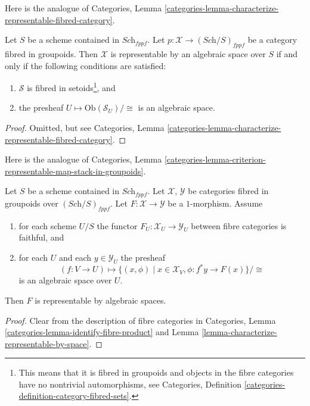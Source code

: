\noindent
Here is the analogue of Categories,
Lemma \ref{categories-lemma-characterize-representable-fibred-category}.

\begin{lemma}
\label{lemma-characterize-representable-by-space}
Let $S$ be a scheme contained in $\textit{Sch}_{fppf}$.
Let $p : \mathcal{X} \to (\textit{Sch}/S)_{fppf}$
be a category fibred in groupoids.
Then $\mathcal{X}$ is representable by an algebraic space over $S$
if and only if the following conditions are satisfied:
\begin{enumerate}
\item $\mathcal{S}$ is fibred in setoids\footnote{This means that
it is fibred in groupoids and objects in the fibre categories
have no nontrivial automorphisms, see Categories,
Definition \ref{categories-definition-category-fibred-sets}.}, and
\item the presheaf $U \mapsto \text{Ob}(\mathcal{S}_U)/\cong$ is
an algebraic space.
\end{enumerate}
\end{lemma}

\begin{proof}
Omitted, but see Categories,
Lemma \ref{categories-lemma-characterize-representable-fibred-category}.
\end{proof}

\noindent
Here is the analogue of Categories,
Lemma \ref{categories-lemma-criterion-representable-map-stack-in-groupoids}.

\begin{lemma}
\label{lemma-criterion-map-representable-spaces-fibred-in-groupoids}
Let $S$ be a scheme contained in $\textit{Sch}_{fppf}$.
Let $\mathcal{X}$, $\mathcal{Y}$ be categories fibred in groupoids
over $(\textit{Sch}/S)_{fppf}$.
Let $F : \mathcal{X} \to \mathcal{Y}$ be a $1$-morphism.
Assume
\begin{enumerate}
\item for each scheme $U/S$ the
functor $F_U : \mathcal{X}_U \longrightarrow \mathcal{Y}_U$
between fibre categories is faithful, and
\item for each $U$ and each $y \in \mathcal{Y}_U$ the presheaf
$$
(f : V \to U)
\longmapsto
\{(x, \phi) \mid x \in \mathcal{X}_V, \phi : f^*y \to F(x)\}/\cong
$$
is an algebraic space over $U$.
\end{enumerate}
Then $F$ is representable by algebraic spaces.
\end{lemma}

\begin{proof}
Clear from the description of fibre categories in
Categories, Lemma \ref{categories-lemma-identify-fibre-product}
and Lemma \ref{lemma-characterize-representable-by-space}.
\end{proof}

